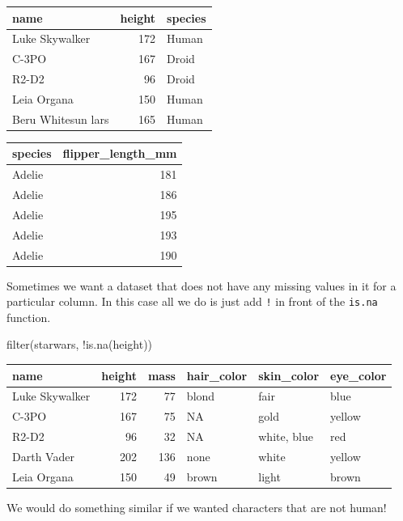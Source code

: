 \documentclass[
  letterpaper,
  DIV=11,
  numbers=noendperiod,
  oneside]{scrreprt}
\newenvironment{Shaded}{\begin{snugshade}}{\end{snugshade}}
\newcommand{\FunctionTok}[1]{\textcolor[rgb]{0.28,0.35,0.67}{#1}}
\newcommand{\NormalTok}[1]{\textcolor[rgb]{0.00,0.23,0.31}{#1}}
\newcommand{\SpecialCharTok}[1]{\textcolor[rgb]{0.37,0.37,0.37}{#1}}
\begin{document}
\begin{tabular}{l|r|l}
\hline
name & height & species\\
\hline
Luke Skywalker & 172 & Human\\
\hline
C-3PO & 167 & Droid\\
\hline
R2-D2 & 96 & Droid\\
\hline
Leia Organa & 150 & Human\\
\hline
Beru Whitesun lars & 165 & Human\\
\hline
\end{tabular}

\begin{tabular}{l|r}
\hline
species & flipper\_length\_mm\\
\hline
Adelie & 181\\
\hline
Adelie & 186\\
\hline
Adelie & 195\\
\hline
Adelie & 193\\
\hline
Adelie & 190\\
\hline
\end{tabular}

Sometimes we want a dataset that does not have any missing values in it
for a particular column. In this case all we do is just add \texttt{!}
in front of the \texttt{is.na} function.

\begin{Shaded}
\begin{Highlighting}[]
\FunctionTok{filter}\NormalTok{(starwars, }\SpecialCharTok{!}\FunctionTok{is.na}\NormalTok{(height))}
\end{Highlighting}
\end{Shaded}

\begin{tabular}{l|r|r|l|l|l}
\hline
name & height & mass & hair\_color & skin\_color & eye\_color\\
\hline
Luke Skywalker & 172 & 77 & blond & fair & blue\\
\hline
C-3PO & 167 & 75 & NA & gold & yellow\\
\hline
R2-D2 & 96 & 32 & NA & white, blue & red\\
\hline
Darth Vader & 202 & 136 & none & white & yellow\\
\hline
Leia Organa & 150 & 49 & brown & light & brown\\
\hline
\end{tabular}

We would do something similar if we wanted characters that are not
human!
\end{document}

